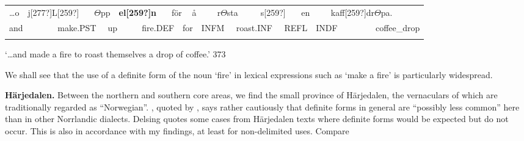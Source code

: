 \begin{tabular}{llllllllllllllllllll}
\lsptoprule
…o & \multicolumn{2}{l}{j[277?]L[259?]

} & \multicolumn{2}{l}{$\Theta $pp

} & \multicolumn{2}{l}{{\bfseries el[259?]n}

} & \multicolumn{2}{l}{för

} & \multicolumn{2}{l}{å

} & \multicolumn{2}{l}{r$\Theta $sta

} & \multicolumn{2}{l}{s[259?]

} & \multicolumn{2}{l}{en

} & \multicolumn{2}{l}{kaff[259?]dr$\Theta $pa.

} & \\
\multicolumn{2}{l}{and

} & \multicolumn{2}{l}{make.PST

} & \multicolumn{2}{l}{up

} & \multicolumn{2}{l}{fire.DEF

} & \multicolumn{2}{l}{for

} & \multicolumn{2}{l}{INFM

} & \multicolumn{2}{l}{roast.INF

} & \multicolumn{2}{l}{REFL

} & \multicolumn{2}{l}{INDF

} & \multicolumn{2}{l}{coffee\_drop

}\\
\lspbottomrule
\end{tabular}

\begin{styleTranslation}
‘…and made a fire to roast themselves a drop of coffee.’ 373

\end{styleTranslation}

\begin{styleBodyTextFirst}
We shall see that the use of a definite form of the noun ‘fire’ in lexical expressions such as ‘make a fire’ is particularly widespread.

\end{styleBodyTextFirst}

\begin{styleBodytextC}
\textbf{Härjedalen.} Between the northern and southern core areas, we find the small province of Härjedalen, the vernaculars of which are traditionally regarded as “Norwegian”. \citet[28]{Reinhammar1973}, quoted by \citet[19]{Delsing2003a}, says rather cautiously that definite forms in general are “possibly less common” here than in other Norrlandic dialects. Delsing quotes some cases from Härjedalen texts where definite forms would be expected but do not occur. This is also in accordance with my findings, at least for non-delimited uses. Compare

\end{styleBodytextC}

